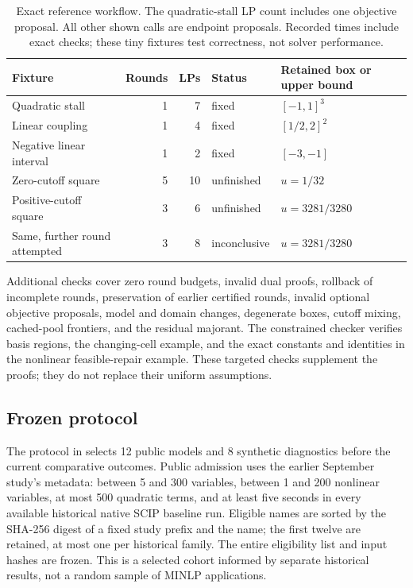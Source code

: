 \begin{table}[htbp]
\centering
\small
\begin{tabular}{@{}lrrll@{}}
\toprule
Fixture & Rounds & LPs & Status & Retained box or upper bound\\
\midrule
Quadratic stall & 1 & 7 & fixed & $[-1,1]^3$\\
Linear coupling & 1 & 4 & fixed & $[1/2,2]^2$\\
Negative linear interval & 1 & 2 & fixed & $[-3,-1]$\\
Zero-cutoff square & 5 & 10 & unfinished & $u=1/32$\\
Positive-cutoff square & 3 & 6 & unfinished & $u=3281/3280$\\
Same, further round attempted & 3 & 8 & inconclusive & $u=3281/3280$\\
\bottomrule
\end{tabular}
\caption{Exact reference workflow. The quadratic-stall LP count includes
one objective proposal. All other shown calls are endpoint proposals.
Recorded times include exact checks; these tiny fixtures test correctness,
not solver performance.}\label{tab:driver}
\end{table}

Additional checks cover zero round budgets, invalid dual proofs,
rollback of incomplete rounds, preservation of earlier certified rounds,
invalid optional objective proposals, model and domain changes,
degenerate boxes, cutoff mixing, cached-pool frontiers, and the residual
majorant. The constrained checker verifies basis regions, the changing-cell
example, and the exact constants and identities in the nonlinear
feasible-repair example. These targeted checks supplement the proofs;
they do not replace their uniform assumptions.

\subsection{Frozen protocol}

The protocol in
selects 12 public models and 8 synthetic diagnostics before the current
comparative outcomes. Public admission uses the earlier September
study's metadata: between 5 and 300 variables, between 1 and 200
nonlinear variables, at most 500 quadratic terms, and at least five
seconds in every available historical native SCIP baseline run.
Eligible names are sorted by the SHA-256 digest of a fixed study prefix
and the name; the first twelve are retained, at most one per historical
family. The entire eligibility list and input hashes are frozen.
This is a selected cohort informed by separate historical results, not
a random sample of MINLP applications.


